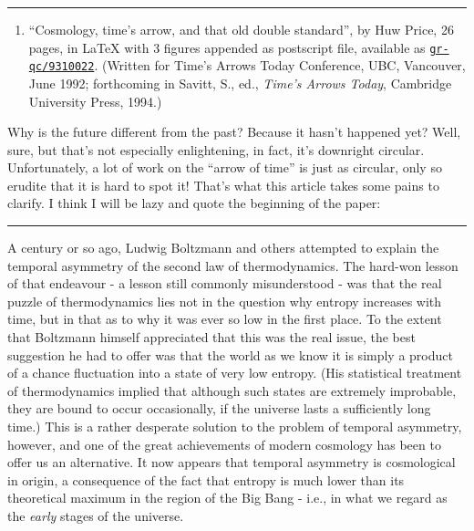 \documentclass{article}
\def\tightlist{}
\begin{document}
\begin{center}\rule{0.5\linewidth}{0.5pt}\end{center}

\begin{enumerate}
\def\labelenumi{\arabic{enumi})}
\tightlist
\item
  ``Cosmology, time's arrow, and that old double standard'', by Huw
  Price, 26 pages, in LaTeX with 3 figures appended as postscript file,
  available as
  \href{http://xxx.lanl.gov/abs/gr-qc/9310022}{\texttt{gr-qc/9310022}}.
  (Written for Time's Arrows Today Conference, UBC, Vancouver, June
  1992; forthcoming in Savitt, S., ed., \emph{Time's Arrows Today},
  Cambridge University Press, 1994.)
\end{enumerate}

Why is the future different from the past? Because it hasn't happened
yet? Well, sure, but that's not especially enlightening, in fact, it's
downright circular. Unfortunately, a lot of work on the ``arrow of
time'' is just as circular, only so erudite that it is hard to spot it!
That's what this article takes some pains to clarify. I think I will be
lazy and quote the beginning of the paper:

\begin{center}\rule{0.5\linewidth}{0.5pt}\end{center}

A century or so ago, Ludwig Boltzmann and others attempted to explain
the temporal asymmetry of the second law of thermodynamics. The hard-won
lesson of that endeavour - a lesson still commonly misunderstood - was
that the real puzzle of thermodynamics lies not in the question why
entropy increases with time, but in that as to why it was ever so low in
the first place. To the extent that Boltzmann himself appreciated that
this was the real issue, the best suggestion he had to offer was that
the world as we know it is simply a product of a chance fluctuation into
a state of very low entropy. (His statistical treatment of
thermodynamics implied that although such states are extremely
improbable, they are bound to occur occasionally, if the universe lasts
a sufficiently long time.) This is a rather desperate solution to the
problem of temporal asymmetry, however, and one of the great
achievements of modern cosmology has been to offer us an alternative. It
now appears that temporal asymmetry is cosmological in origin, a
consequence of the fact that entropy is much lower than its theoretical
maximum in the region of the Big Bang - i.e., in what we regard as the
\emph{early} stages of the universe.
\end{document}
